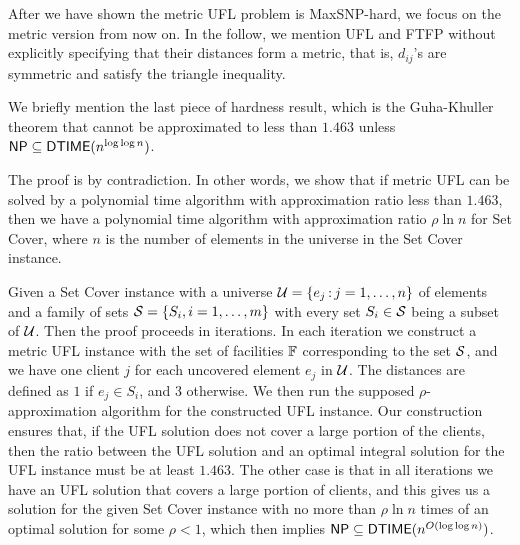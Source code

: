 \documentclass[oneside,final]{ucr}
\begin{document}
After we have shown the metric UFL problem is MaxSNP-hard, we focus on
the metric version from now on. In the follow, we mention UFL and FTFP
without explicitly specifying that their distances form a metric, that
is, $d_{ij}$'s are symmetric and satisfy the triangle inequality.

We briefly mention the last piece of hardness result, which is the
Guha-Khuller theorem that {\UFL} cannot be approximated to less than
$1.463$ unless ${\mbox{\sf NP}} \subseteq {\mbox{\sf DTIME}}(n^{\log\log n})$.

The proof is by contradiction. In other words, we show that
if metric UFL can be solved by a polynomial time algorithm
with approximation ratio less than $1.463$, then we have a
polynomial time algorithm with approximation ratio $\rho \ln
n$ for Set Cover, where $n$ is the number of elements in the
universe in the Set Cover instance.

Given a Set Cover instance with a universe $\calU = \{e_j
\suchthat j=1,\ldots, n\}$ of elements and a family of sets
$\calS = \{S_i, i=1,\ldots,m\}$ with every set $S_i \in
\calS$ being a subset of $\calU$. Then the proof proceeds in
iterations. In each iteration we construct a metric UFL
instance with the set of facilities $\mathbb{F}$
corresponding to the set $\calS$, and we have one client $j$
for each uncovered element $e_j$ in $\calU$. The distances
are defined as $1$ if $e_j \in S_i$, and $3$ otherwise. We
then run the supposed $\rho$-approximation algorithm for the
constructed UFL instance. Our construction ensures that, if
the UFL solution does not cover a large portion of the
clients, then the ratio between the UFL solution and an
optimal integral solution for the UFL instance must be at
least $1.463$. The other case is that in all iterations we
have an UFL solution that covers a large portion of clients,
and this gives us a solution for the given Set Cover
instance with no more than $\rho \ln n$ times of an optimal
solution for some $\rho < 1$, which then implies ${\mbox{\sf NP}}
\subseteq {\mbox{\sf DTIME}}(n^{O(\log\log n)})$.
\end{document}

